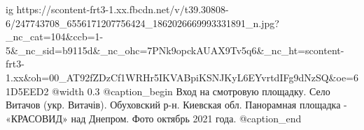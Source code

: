  
 
 
 
 

\ifcmt
  ig https://scontent-frt3-1.xx.fbcdn.net/v/t39.30808-6/247743708_6556171207756424_1862026669993331891_n.jpg?_nc_cat=104&ccb=1-5&_nc_sid=b9115d&_nc_ohc=7PNk9opckAUAX9Tv5q6&_nc_ht=scontent-frt3-1.xx&oh=00_AT92fZDzCf1WRHr5IKVABpiKSNJKyL6EYvrtdIFg9dNzSQ&oe=61D5EED2
  @width 0.3
  @caption_begin
    Вход на смотровую площадку.
    Село Витачов (укр. Витачів). Обуховский р-н. Киевская обл. Панорамная площадка
    - «КРАСОВИД» над Днепром. Фото октябрь 2021 года.
  @caption_end
\fi
